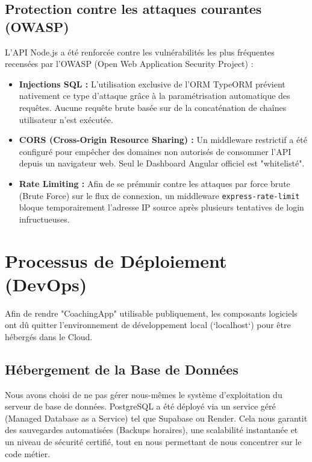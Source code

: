 \subsection{Protection contre les attaques courantes (OWASP)}
L'API Node.js a été renforcée contre les vulnérabilités les plus fréquentes recensées par l'OWASP (Open Web Application Security Project) :
\begin{itemize}
    \item \textbf{Injections SQL :} L'utilisation exclusive de l'ORM TypeORM prévient nativement ce type d'attaque grâce à la paramétrisation automatique des requêtes. Aucune requête brute basée sur de la concaténation de chaînes utilisateur n'est exécutée.
    \item \textbf{CORS (Cross-Origin Resource Sharing) :} Un middleware restrictif a été configuré pour empêcher des domaines non autorisés de consommer l'API depuis un navigateur web. Seul le Dashboard Angular officiel est "whitelisté".
    \item \textbf{Rate Limiting :} Afin de se prémunir contre les attaques par force brute (Brute Force) sur le flux de connexion, un middleware \texttt{express-rate-limit} bloque temporairement l'adresse IP source après plusieurs tentatives de login infructueuses.
\end{itemize}

\section{Processus de Déploiement (DevOps)}
Afin de rendre "CoachingApp" utilisable publiquement, les composants logiciels ont dû quitter l'environnement de développement local (`localhost`) pour être hébergés dans le Cloud.

\subsection{Hébergement de la Base de Données}
Nous avons choisi de ne pas gérer nous-mêmes le système d'exploitation du serveur de base de données. PostgreSQL a été déployé via un service géré (Managed Database as a Service) tel que Supabase ou Render.
Cela nous garantit des sauvegardes automatisées (Backups horaires), une scalabilité instantanée et un niveau de sécurité certifié, tout en nous permettant de nous concentrer sur le code métier.

